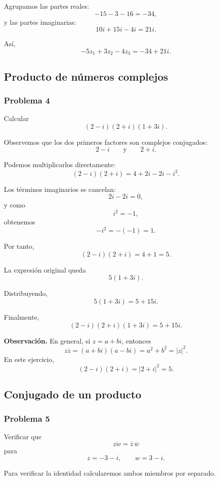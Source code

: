 Agrupamos las partes reales:
\[
-15-3-16=-34,
\]
y las partes imaginarias:
\[
10i+15i-4i=21i.
\]

Así,
\[
\boxed{
-5z_1+3z_2-4z_3=-34+21i
}.
\]

\subsection{Producto de números complejos}

\subsubsection*{Problema 4}

Calcular
\[
(2-i)(2+i)(1+3i).
\]

Observemos que los dos primeros factores son complejos conjugados:
\[
2-i
\qquad\text{y}\qquad
2+i.
\]

Podemos multiplicarlos directamente:
\[
(2-i)(2+i)
=
4+2i-2i-i^2.
\]

Los términos imaginarios se cancelan:
\[
2i-2i=0,
\]
y como
\[
i^2=-1,
\]
obtenemos
\[
-i^2=-(-1)=1.
\]

Por tanto,
\[
(2-i)(2+i)=4+1=5.
\]

La expresión original queda
\[
5(1+3i).
\]

Distribuyendo,
\[
5(1+3i)=5+15i.
\]

Finalmente,
\[
\boxed{
(2-i)(2+i)(1+3i)=5+15i
}.
\]

\medskip

\noindent
\textbf{Observación.}
En general, si $z=a+bi$, entonces
\[
z\overline z=(a+bi)(a-bi)=a^2+b^2=|z|^2.
\]
En este ejercicio,
\[
(2-i)(2+i)=|2+i|^2=5.
\]

\subsection{Conjugado de un producto}

\subsubsection*{Problema 5}

Verificar que
\[
\overline{zw}=\overline z\,\overline w
\]
para
\[
z=-3-i,
\qquad
w=3-i.
\]

Para verificar la identidad calcularemos ambos miembros por separado.

